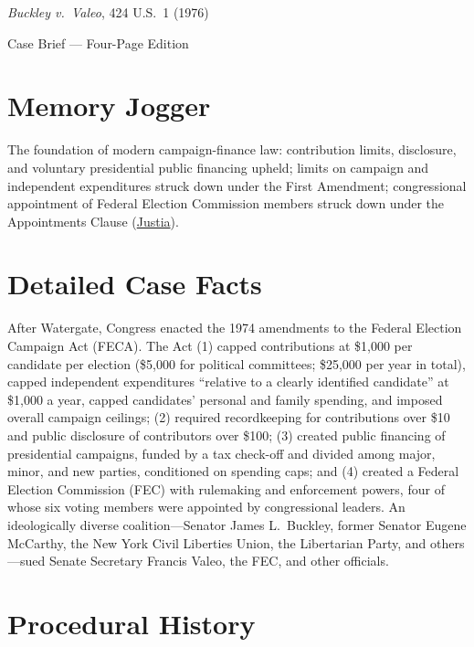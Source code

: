 \documentclass[12pt]{article}
\begin{document}
\begin{center}
{\LARGE \textit{Buckley v.\ Valeo}, 424 U.S.\ 1 (1976)\par}
\vspace{0.8em}
{\large Case Brief --- Four-Page Edition\par}
\end{center}
\vspace{1em}

\section{Memory Jogger}

The foundation of modern campaign-finance law: contribution limits, disclosure, and voluntary presidential public financing upheld; limits on campaign and independent expenditures struck down under the First Amendment; congressional appointment of Federal Election Commission members struck down under the Appointments Clause (\href{https://supreme.justia.com/cases/federal/us/424/1/}{Justia}).

\section{Detailed Case Facts}

After Watergate, Congress enacted the 1974 amendments to the Federal Election Campaign Act (FECA). The Act (1) capped contributions at \$1,000 per candidate per election (\$5,000 for political committees; \$25,000 per year in total), capped independent expenditures ``relative to a clearly identified candidate'' at \$1,000 a year, capped candidates' personal and family spending, and imposed overall campaign ceilings; (2) required recordkeeping for contributions over \$10 and public disclosure of contributors over \$100; (3) created public financing of presidential campaigns, funded by a tax check-off and divided among major, minor, and new parties, conditioned on spending caps; and (4) created a Federal Election Commission (FEC) with rulemaking and enforcement powers, four of whose six voting members were appointed by congressional leaders. An ideologically diverse coalition---Senator James L.\ Buckley, former Senator Eugene McCarthy, the New York Civil Liberties Union, the Libertarian Party, and others---sued Senate Secretary Francis Valeo, the FEC, and other officials.

\section{Procedural History}
\end{document}
